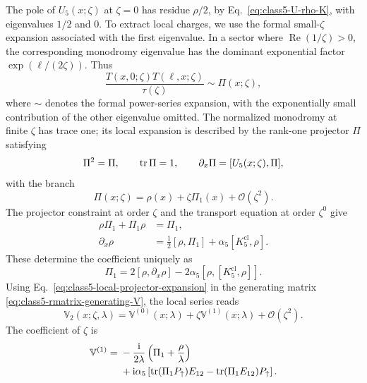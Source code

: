 The pole of $U_5(x;\zeta)$ at $\zeta=0$ has residue $\rho/2$, by
Eq.~\eqref{eq:class5-U-rho-K}, with eigenvalues $1/2$ and $0$.
To extract local charges, we use the formal small-$\zeta$ expansion
associated with the first eigenvalue.  In a sector where
$\operatorname{Re}(1/\zeta)>0$, the corresponding monodromy eigenvalue
has the dominant exponential factor $\exp(\ell/(2\zeta))$.  Thus
\begin{equation}
\frac{T(x,0;\zeta)T(\ell,x;\zeta)}{\tau(\zeta)}
\sim\Pi(x;\zeta),
\label{eq:class5-normalized-monodromy-asymptotics}
\end{equation}
where $\sim$ denotes the formal power-series expansion, with the
exponentially small contribution of the other eigenvalue omitted.
The normalized monodromy at finite $\zeta$ has trace one; its local
expansion is described by the rank-one projector $\Pi$ satisfying
\begin{equation}
\Pi^2=\Pi,
\qquad
\operatorname{tr}\Pi=1,
\qquad
\partial_x\Pi=[U_5(x;\zeta),\Pi],
\label{eq:class5-local-projector-equations}
\end{equation}
with the branch
\begin{equation}
\Pi(x;\zeta)
=
\rho(x)+\zeta\Pi_1(x)+\mathcal O(\zeta^2).
\label{eq:class5-local-projector-expansion}
\end{equation}
The projector constraint at order $\zeta$ and the transport equation
at order $\zeta^0$ give
\begin{equation}
\begin{aligned}
\rho\Pi_1+\Pi_1\rho&=\Pi_1,\\
\partial_x\rho&=\frac12[\rho,\Pi_1]
 +\alpha_5[K^{\mathrm{cl}}_5,\rho].
\end{aligned}
\label{eq:class5-Pi1-equations}
\end{equation}
These determine the coefficient uniquely as
\begin{equation}
\Pi_1
=
2[\rho,\partial_x\rho]
-2\alpha_5[\rho,[K^{\mathrm{cl}}_5,\rho]].
\label{eq:class5-Pi1-solution}
\end{equation}
Using Eq.~\eqref{eq:class5-local-projector-expansion} in the generating
matrix \eqref{eq:class5-rmatrix-generating-V}, the local series reads
\begin{equation}
\mathbb V_2(x;\zeta,\lambda)
=
\mathbb V^{(0)}(x;\lambda)
+\zeta\mathbb V^{(1)}(x;\lambda)
+\mathcal O(\zeta^2).
\label{eq:class5-generating-V-expansion}
\end{equation}
The coefficient of $\zeta$ is
\begin{align}
\mathbb V^{(1)}
={}&
-\frac{\mathrm{i}}{2\lambda}
\left(
\Pi_1+\frac{\rho}{\lambda}
\right)
\nonumber\\
&+\mathrm{i}\alpha_5\left[
\operatorname{tr}(\Pi_1P_{\uparrow})E_{12}
-\operatorname{tr}(\Pi_1E_{12})P_{\uparrow}
\right].
\label{eq:class5-generating-V-first-coefficient}
\end{align}
